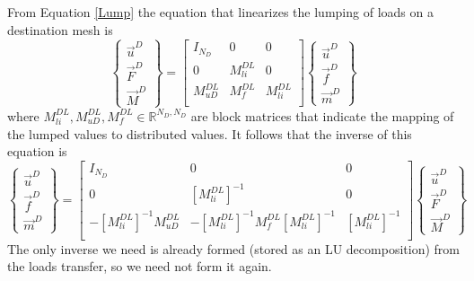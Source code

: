 \documentclass[10pt,letterpaper,oneside,notitlepage]{article}
\begin{document}
From Equation \ref{Lump} the equation that linearizes the lumping of loads on a destination mesh is
\begin{equation}
\label{LumpD}
	\left\{	\begin{matrix} \vec{u}^D \\ \vec{F}^{D} \\ \vec{M}^{D} \end{matrix} \right\} 
=
	\begin{bmatrix}
	I_{\mathit{N_D}} & 0   				 & 0   \\
	0 							 & M_{li}^{DL} & 0   \\
	M_{uD}^{DL}      & M_{f}^{DL}  & M_{li}^{DL} \\
	\end{bmatrix}
	\left\{	\begin{matrix} \vec{u}^D \\ \vec{f}^{D} \\ \vec{m}^{D} \end{matrix} \right\} 
\end{equation}
where $M_{li}^{DL}, M_{uD}^{DL}, M_{f}^{DL} \in \mathbb{R}^{ \mathit{N_{D}},\mathit{N_{D}}}$ are block matrices that indicate the mapping of the lumped values to distributed values. It follows that the inverse of this equation is
\begin{equation}
\label{InvLumpD}
	\left\{	\begin{matrix} \vec{u}^D \\ \vec{f}^{D} \\ \vec{m}^{D} \end{matrix} \right\} 
=
	\begin{bmatrix}
	I_{\mathit{N_D}} & 0   				 & 0   \\
	0 							 & \left[ M_{li}^{DL} \right]^{-1} & 0   \\
	-\left[ M_{li}^{DL} \right]^{-1} M_{uD}^{DL} & 
	-\left[ M_{li}^{DL} \right]^{-1} M_{f}^{DL} \left[ M_{li}^{DL} \right]^{-1}  &
	 \left[ M_{li}^{DL} \right]^{-1} \\
	\end{bmatrix}
	\left\{	\begin{matrix} \vec{u}^D \\ \vec{F}^{D} \\ \vec{M}^{D} \end{matrix} \right\} 
\end{equation}
The only inverse we need is already formed (stored as an LU decomposition) from the loads transfer, so we need not form it again.
\end{document}
